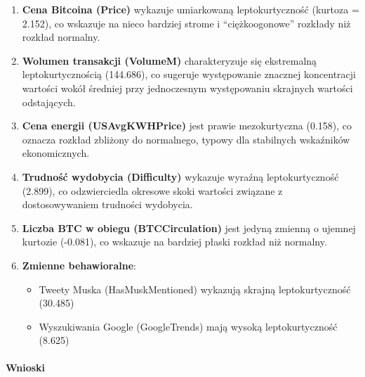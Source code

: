 \documentclass[
  11pt,
]{article}
\providecommand{\tightlist}{%
  \setlength{\itemsep}{0pt}\setlength{\parskip}{0pt}}
\begin{document}
\begin{enumerate}
\def\labelenumi{\arabic{enumi}.}
\item
  \textbf{Cena Bitcoina (Price)} wykazuje umiarkowaną leptokurtyczność
  (kurtoza = 2.152), co wskazuje na nieco bardziej strome i
  ``ciężkoogonowe'' rozkłady niż rozkład normalny.
\item
  \textbf{Wolumen transakcji (VolumeM)} charakteryzuje się ekstremalną
  leptokurtycznością (144.686), co sugeruje występowanie znacznej
  koncentracji wartości wokół średniej przy jednoczesnym występowaniu
  skrajnych wartości odstających.
\item
  \textbf{Cena energii (USAvgKWHPrice)} jest prawie mezokurtyczna
  (0.158), co oznacza rozkład zbliżony do normalnego, typowy dla
  stabilnych wskaźników ekonomicznych.
\item
  \textbf{Trudność wydobycia (Difficulty)} wykazuje wyraźną
  leptokurtyczność (2.899), co odzwierciedla okresowe skoki wartości
  związane z dostosowywaniem trudności wydobycia.
\item
  \textbf{Liczba BTC w obiegu (BTCCirculation)} jest jedyną zmienną o
  ujemnej kurtozie (-0.081), co wskazuje na bardziej płaski rozkład niż
  normalny.
\item
  \textbf{Zmienne behawioralne}:

  \begin{itemize}
  \tightlist
  \item
    Tweety Muska (HasMuskMentioned) wykazują skrajną leptokurtyczność
    (30.485)
  \item
    Wyszukiwania Google (GoogleTrends) mają wysoką leptokurtyczność
    (8.625)
  \end{itemize}
\end{enumerate}

\paragraph{Wnioski}\label{wnioski-2}
\end{document}
